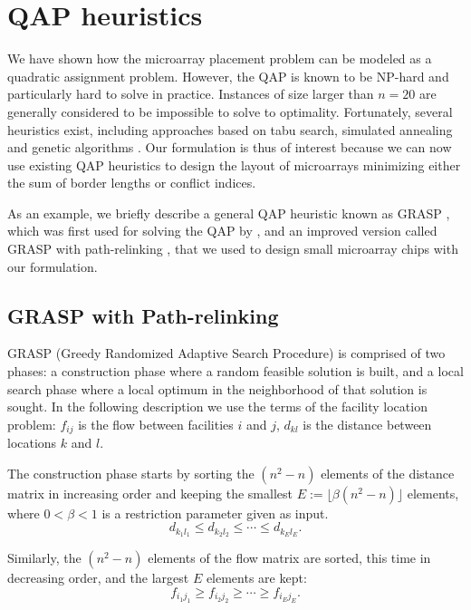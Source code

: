 \section{QAP heuristics}
\label{sec:qap_heuristics}

We have shown how the microarray placement problem can be modeled as a
quadratic assignment problem. However, the QAP is known to be NP-hard and
particularly hard to solve in practice. Instances of size larger than
$n = 20$ are generally considered to be impossible to solve to
optimality. Fortunately, several heuristics exist, including approaches based on
tabu search, simulated annealing and genetic algorithms
\citep[for a survey, see][]{Cela1997,Loiola2007}. Our formulation is thus of
interest because we can now use existing QAP heuristics to design the layout of
microarrays minimizing either the sum of border lengths or conflict indices.

As an example, we briefly describe a general QAP heuristic known as GRASP \citep
{Li1994}, which was first used for solving the QAP by \citet{Feo1995}, and an
improved version called GRASP with path-relinking \citep{Oliveira2004}, that we
used to design small microarray chips with our formulation.

\subsection{GRASP with Path-relinking}
\label{sec:qap_grasp}

GRASP (Greedy Randomized Adaptive Search Procedure) is comprised of two phases:
a construction phase where a random feasible solution is built, and a local
search phase where a local optimum in the neighborhood of that solution is
sought. In the following description we use the terms of the facility location
problem: $f_{ij}$ is the flow between facilities $i$ and $j$, $d_{kl}$ is the
distance between locations $k$ and $l$.

The construction phase starts by sorting the $(n^2 - n)$ elements of the
distance matrix in increasing order and keeping the smallest
$E:= \lfloor \beta (n^2 - n) \rfloor$ elements, where $0 < \beta < 1$ is a
restriction parameter given as input.
\begin{displaymath}
d_{k_1 l_1} \le d_{k_2 l_2} \le \cdots \le d_{k_E l_E}.
\end{displaymath}

Similarly, the $(n^2 - n)$ elements of the flow matrix are sorted, this time in
decreasing order, and the largest $E$ elements are kept:
\begin{displaymath}
f_{i_1 j_1} \ge f_{i_2 j_2} \ge \cdots \ge f_{i_E j_E}.
\end{displaymath}


